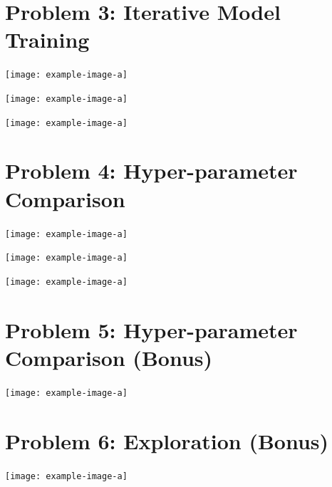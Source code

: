 \documentclass{article}
\begin{document}
\section{Problem 3: Iterative Model Training}
\begin{answer}[title=Plot,height=9.5cm,width=\linewidth]
    \centering
    \texttt{[image: example-image-a]}
\end{answer}

\begin{answer}[title=Plot,height=9.5cm,width=\linewidth]
    \centering
    \texttt{[image: example-image-a]}
\end{answer}

\begin{answer}[title=Plot,height=9.5cm,width=\linewidth]
    \centering
    \texttt{[image: example-image-a]}
\end{answer}

\section{Problem 4: Hyper-parameter Comparison}
\begin{answer}[title=Plot,height=9.5cm,width=\linewidth]
    \centering
    \texttt{[image: example-image-a]}
\end{answer}

\begin{answer}[title=Plot,height=9.5cm,width=\linewidth]
    \centering
    \texttt{[image: example-image-a]}
\end{answer}

\begin{answer}[title=Plot,height=9.5cm,width=\linewidth]
    \centering
    \texttt{[image: example-image-a]}
\end{answer}


\section{Problem 5: Hyper-parameter Comparison (Bonus)}
\begin{answer}[title=Plot,height=9.5cm,width=\linewidth]
    \centering
    \texttt{[image: example-image-a]}
\end{answer}


\section{Problem 6: Exploration (Bonus)}
\begin{answer}[title=Plot,height=9.5cm,width=\linewidth]
    \centering
    \texttt{[image: example-image-a]}
\end{answer}
\end{document}
